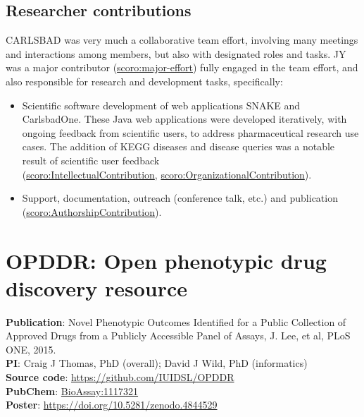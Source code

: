 \subsection{Researcher contributions}

CARLSBAD was very much a collaborative team effort, involving many meetings and interactions among members, but also with designated roles and tasks. JY was a major contributor (\href{http://purl.org/spar/scoro/major-effort}{scoro:major-effort}) fully engaged in the team effort, and also responsible for research and development tasks, specifically:

\begin{itemize}[topsep=0pt,itemsep=0pt,partopsep=0pt,parsep=0pt]
    \item Scientific software development of web applications SNAKE and CarlsbadOne. These Java web applications were developed iteratively, with ongoing feedback from scientific users, to address pharmaceutical research use cases. The addition of KEGG diseases and disease queries was a notable result of scientific user feedback\\ (\href{http://purl.org/spar/scoro/IntellectualContribution}{scoro:IntellectualContribution}, \href{http://purl.org/spar/scoro/OrganizationalContribution}{scoro:OrganizationalContribution}).
    \item Support, documentation, outreach (conference talk, etc.) and publication\\
    (\href{http://purl.org/spar/scoro/AuthorshipContribution}{scoro:AuthorshipContribution}). 
\end{itemize}

\newpage

\section{OPDDR: Open phenotypic drug discovery resource}
\label{section:opddr}

\textbf{Publication}: Novel Phenotypic Outcomes Identified for a Public Collection of Approved Drugs from a Publicly Accessible Panel of Assays, J. Lee, et al, PLoS ONE, 2015\cite{Lee2015-vg}.\\
\textbf{PI}: Craig J Thomas, PhD (overall); David J Wild, PhD (informatics)\\
\textbf{Source code}: \href{https://github.com/IUIDSL/OPDDR}{https://github.com/IUIDSL/OPDDR}\\
\textbf{PubChem}: \href{https://pubchem.ncbi.nlm.nih.gov/bioassay/1117321}{BioAssay:1117321}\\
\textbf{Poster}: \href{https://doi.org/10.5281/zenodo.4844529}{https://doi.org/10.5281/zenodo.4844529}

